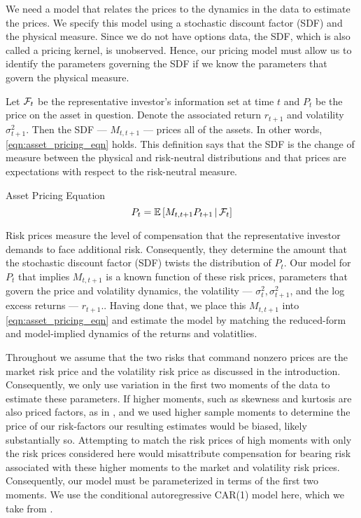 \documentclass[11pt, letterpaper, twoside]{article}
\begin{document}
\addtocounter{subsection}{1}

We need a model that relates the prices to the dynamics in the data to estimate the prices. We specify this model using a stochastic discount factor (SDF) and the physical measure. Since we do not have options data, the SDF, which is also called a pricing kernel, is unobserved. Hence, our pricing model must allow us to identify the parameters governing the SDF if we know the parameters that govern the physical measure. 

Let $\mathcal{F}_t$ be the representative investor's information set at time $t$ and $P_t$ be the price on the asset in question. Denote the associated return $r_{t+1}$ and volatility $\sigma^2_{t+1}$. Then the SDF --- $M_{t,t+1}$ --- prices all of the assets. In other words, \cref{eqn:asset_pricing_eqn} holds. This definition says that the SDF is the change of measure between the physical and risk-neutral distributions and that prices are expectations with respect to the risk-neutral measure.

\begin{defn}{Asset Pricing Equation}
  \label{eqn:asset_pricing_eqn}
  \begin{equation}
    P_t = \operatorname{\mathbb{E}}\left[M_{t,t+1} P_{t+1} \,\middle\vert\, \mathcal{F}_t \right] 
  \end{equation}
\end{defn}

Risk prices measure the level of compensation that the representative investor demands to face additional risk. Consequently, they determine the amount that the stochastic discount factor (SDF) twists the distribution of $P_t$. Our model for $P_t$ that implies $M_{t,t+1}$ is a known function of these risk prices, parameters that govern the price and volatility dynamics, the volatility --- $\sigma^2_{t}, \sigma^2_{t+1}$, and the log excess returns --- $r_{t+1}$.. Having done that, we place this $M_{t,t+1}$ into \cref{eqn:asset_pricing_eqn} and estimate the model by matching the reduced-form and model-implied dynamics of the returns and volatitlies.

Throughout we assume that the two risks that command nonzero prices are the market risk price and the volatility risk price as discussed in the introduction. Consequently, we only use variation in the first two moments of the data to estimate these parameters. If higher moments, such as skewness and kurtosis are also priced factors, as in \textcites{harvey2000conditional, conrad2012exante, chang2013market}, and we used higher sample moments to determine the price of our risk-factors our resulting estimates would be biased, likely substantially so. Attempting to match the risk prices of high moments with only the risk prices considered here would misattribute compensation for bearing risk associated with these higher moments to the market and volatility risk prices. Consequently, our model must be parameterized in terms of the first two moments. We use the conditional autoregressive CAR(1) model here, which we take from \textcite{darolles2006structural,han2018leverage}. 
\end{document}

